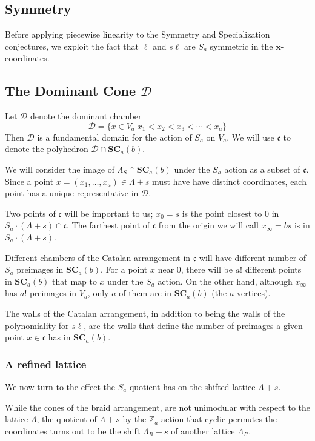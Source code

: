 \documentclass{amsart}[12pt]
\theoremstyle{definition}
\newcommand{\Z}{\mathbb{Z}}
\newcommand{\SC}{\mathbf{SC}}
\newcommand{\sk}{s\ell}
\newcommand{\cone}{\mathfrak{c}}
\newcommand{\dominant}{\mathcal{D}}
\begin{document}
\subsection{Symmetry}

Before applying piecewise linearity to the Symmetry and Specialization conjectures, we exploit the fact that $\ell$ and $\sk$ are $S_a$ symmetric in the $\mathbf{x}$-coordinates.


\subsection{The Dominant Cone $\dominant$}

Let $\dominant$ denote the dominant chamber $$\dominant=\{x\in V_a|x_1< x_2< x_3<\cdots < x_a\}$$
Then $\dominant$ is a fundamental domain for the action of $S_a$ on $V_a$.  We will use $\cone$ to denote the polyhedron $\dominant\cap\SC_{a}(b)$.  

We will consider the image of $\Lambda_S\cap \SC_{a}(b)$ under the $S_a$ action as a subset of $\cone$.   Since a point $x=(x_1,\dots,x_a)\in\Lambda+s$ must have have distinct coordinates, each point has a unique representative in $\dominant$.  

Two points of $\cone$ will be important to us; $x_0=s$ is the point closest to $0$ in $S_a\cdot(\Lambda+s)\cap\cone$.  The farthest point of $\cone$ from the origin we will call $x_\infty=bs$ is in $S_a\cdot(\Lambda+s)$.

Different chambers of the Catalan arrangement in $\cone$ will have different number of $S_a$ preimages in $\SC_a(b)$.  For a point $x$ near $0$, there will be $a!$ different points in $\SC_a(b)$ that map to $x$ under the $S_a$ action.  On the other hand, although $x_\infty$ has $a!$ preimages in $V_a$, only $a$ of them are in $\SC_a(b)$ (the $a$-vertices).

The walls of the Catalan arrangement, in addition to being the walls of the polynomiality for $\sk$, are the walls that define the number of preimages a given point $x\in\cone$ has in $\SC_a(b)$.


\subsubsection{A refined lattice}

We now turn to the effect the $S_a$ quotient has on the shifted lattice $\Lambda+s$.

While the cones of the braid arrangement, are not unimodular with respect to the lattice $\Lambda$, the quotient of $\Lambda+s$ by the $\Z_a$ action that cyclic permutes the coordinates turns out to be the shift $\Lambda_R+s$ of another lattice $\Lambda_R$.
\end{document}
